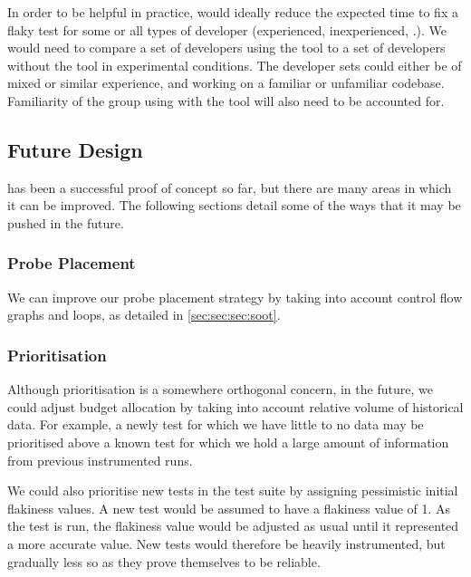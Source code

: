 In order to be helpful in practice, \venera would ideally reduce the expected
time to fix a flaky test for some or all types of developer (experienced,
inexperienced, \etc.). We would need to compare a set of developers using the
tool to a set of developers without the tool in experimental conditions. The
developer sets could either be of mixed or similar experience, and working on a
familiar or unfamiliar codebase. Familiarity of the group using \venera with
the tool will also need to be accounted for.


\subsection{Future Design}
\label{sec:sec:future_design}

\venera has been a successful proof of concept so far, but there are many areas
in which it can be improved. The following sections detail some of the ways that
it may be pushed in the future.

\subsubsection{Probe Placement}

We can improve our probe placement strategy by taking into account control flow
graphs and loops, as detailed in \autoref{sec:sec:sec:soot}.

\subsubsection{Prioritisation}

Although prioritisation is a somewhere orthogonal concern, in the future, we
could adjust \flaky budget allocation by taking into account relative volume of
historical data. For example, a newly \flaky test for which we have little to no
data may be prioritised above a known \flaky test for which we hold a large
amount of information from previous instrumented runs.

We could also prioritise new tests in the test suite by assigning pessimistic
initial flakiness values. A new test would be assumed to have a flakiness value
of 1. As the test is run, the flakiness value would be adjusted as usual until
it represented a more accurate value. New tests would therefore be heavily
instrumented, but gradually less so as they prove themselves to be reliable.

